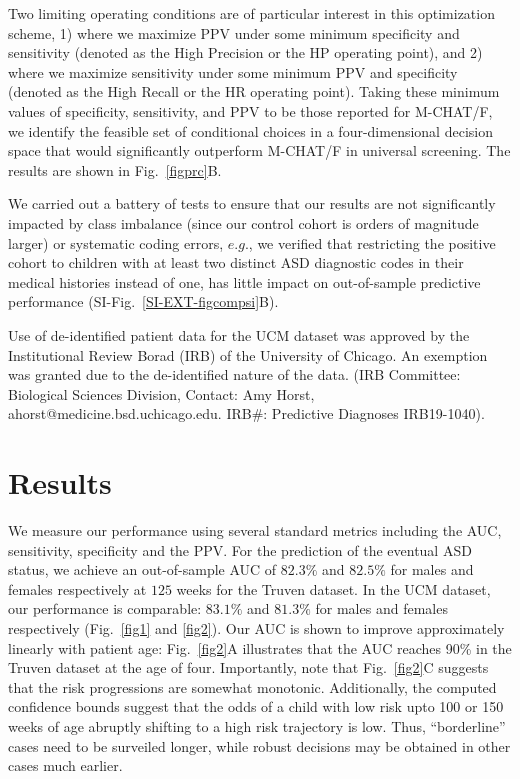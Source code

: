 \documentclass[onecolumn,10pt]{IEEEtran}
\def\treatment{positive\xspace}
\begin{document}
Two limiting operating conditions are  of particular interest in this optimization scheme, 1) where we maximize PPV under some minimum specificity and sensitivity (denoted as  the High Precision or the HP operating point), and 2) where we maximize sensitivity under some minimum PPV and specificity (denoted as the High Recall or the HR  operating point). Taking these minimum values of specificity, sensitivity, and PPV to be those reported for  M-CHAT/F, we identify the feasible set of conditional choices in a four-dimensional decision space  that would  significantly outperform M-CHAT/F in universal screening. The results are shown in Fig.~\ref{figprc}B.

We carried out a battery of tests to ensure that our results are not significantly impacted by class imbalance (since our control cohort is orders of magnitude larger) or systematic coding errors, $e.g.$, we verified that restricting the \treatment cohort to children with at least two  distinct ASD diagnostic codes in their medical histories instead of one, has little impact on  out-of-sample predictive performance (SI-Fig.~\ref{SI-EXT-figcompsi}B). 

Use of de-identified patient data for the UCM dataset was approved by the Institutional Review Borad (IRB) of the University of Chicago. An exemption was granted due to the de-identified nature of the data. (IRB Committee: Biological Sciences Division, Contact: Amy Horst, ahorst@medicine.bsd.uchicago.edu. IRB\#: Predictive Diagnoses IRB19-1040).

\section*{Results}
We measure our performance using several standard metrics including the AUC, sensitivity, specificity and the PPV. For the prediction of the eventual ASD  status, we achieve an out-of-sample AUC of $82.3\%$ and  $82.5\%$ for males and females respectively at $125$ weeks for the Truven dataset. In the UCM dataset, our performance is comparable: $83.1\%$ and $81.3\%$ for males and females respectively (Fig.~\ref{fig1} and \ref{fig2}).  Our AUC is shown to improve approximately  linearly  with patient age: Fig.~\ref{fig2}A illustrates that the  AUC  reaches 90\%  in the Truven dataset at the age of four. Importantly, note that Fig.~\ref{fig2}C suggests that the risk progressions are somewhat monotonic. Additionally, the computed confidence bounds suggest that the odds of a child with low risk upto 100 or 150 weeks of age abruptly shifting to a high risk trajectory is low. Thus,  ``borderline'' cases need to be surveiled longer, while robust decisions may be obtained in other cases much earlier.
\end{document}
